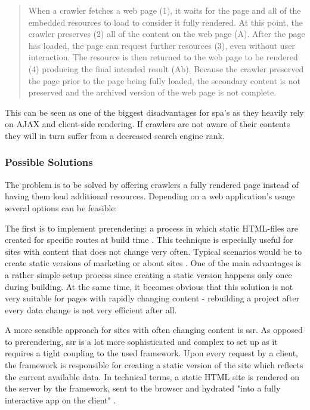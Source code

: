 \begin{quotation}
When a crawler fetches a web page (1), it waits for the page and all of the embedded resources to load to consider it fully rendered. At this point, the crawler preserves (2) all of the content on the web page (A). After the page has loaded, the page can request further resources (3), even without user interaction. The resource is then returned to the web page to be rendered (4) producing the final intended result (Ab). Because the crawler preserved the page prior to the page being fully loaded, the secondary content is not preserved and the archived version of the web page is not complete.
\end{quotation}

This can be seen as one of the biggest disadvantages for \acrshort{spa}'s as they heavily rely on AJAX and client-side rendering. If crawlers are not aware of their contents they will in turn suffer from a decreased search engine rank. 

\subsubsection{Possible Solutions} \label{subsub:seo}
The problem is to be solved by offering crawlers a fully rendered page instead of having them load additional resources. Depending on a web application's usage several options can be feasible:

The first is to implement prerendering: a process in which static HTML-files are created for specific routes at build time \cite{VueSSR:online}. This technique is especially useful for sites with content that does not change very often. Typical scenarios would be to create static versions of marketing or about sites \cite{VueSSR:online}. One of the main advantages is a rather simple setup process since creating a static version happens only once during building. At the same time, it becomes obvious that this solution is not very suitable for pages with rapidly changing content - rebuilding a project after every data change is not very efficient after all.

A more sensible approach for sites with often changing content is \acrfull{ssr}. As opposed to prerendering, \acrshort{ssr} is a lot more sophisticated and complex to set up as it requires a tight coupling to the used framework. Upon every request by a client, the framework is responsible for creating a static version of the site which reflects the current available data. In technical terms, a static HTML site is rendered on the server by the framework, sent to the browser and hydrated "into a fully interactive app on the client" \cite{VueSSR:online}.

